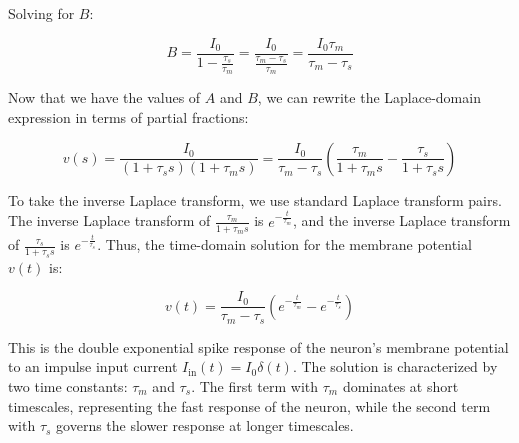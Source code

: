\documentclass{article}
\begin{document}
Solving for $B$:

\begin{equation}
    B = \frac{I_0}{1 - \frac{\tau_s}{\tau_m}} = \frac{I_0}{\frac{\tau_m - \tau_s}{\tau_m}} = \frac{I_0 \tau_m}{\tau_m - \tau_s}
\end{equation}

Now that we have the values of $A$ and $B$, we can rewrite the Laplace-domain expression in terms of partial fractions:

\begin{equation}
    v(s) = \frac{I_0}{(1 + \tau_s s)(1 + \tau_m s)} = \frac{I_0}{\tau_m - \tau_s} \left(\frac{\tau_m}{1 + \tau_m s} - \frac{\tau_s}{1 + \tau_s s}\right)
\end{equation}

To take the inverse Laplace transform, we use standard Laplace transform pairs. The inverse Laplace transform of $\frac{\tau_m}{1 + \tau_m s}$ is $e^{-\frac{t}{\tau_m}}$, and the inverse Laplace transform of $\frac{\tau_s}{1 + \tau_s s}$ is $e^{-\frac{t}{\tau_s}}$. Thus, the time-domain solution for the membrane potential $v(t)$ is:

\begin{equation}
    v(t) = \frac{I_0}{\tau_m - \tau_s} \left(e^{-\frac{t}{\tau_m}} - e^{-\frac{t}{\tau_s}}\right)
\end{equation}

This is the double exponential spike response of the neuron's membrane potential to an impulse input current $I_{\text{in}}(t) = I_0 \delta(t)$. The solution is characterized by two time constants: $\tau_m$ and $\tau_s$. The first term with $\tau_m$ dominates at short timescales, representing the fast response of the neuron, while the second term with $\tau_s$ governs the slower response at longer timescales.
\end{document}
